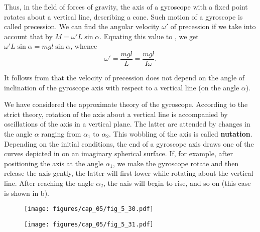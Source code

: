 Thus, in the field of forces of gravity, the axis of a gyroscope with a fixed point rotates about a vertical line, describing a cone. Such motion of a gyroscope is called precession. We can find the angular velocity $\omega'$ of precession if we take into account that by  $M=\omega'L\sin\alpha$. Equating this value to , we get $\omega'L\sin\alpha=mgl\sin\alpha$, whence
\begin{equation}\label{eq:5_72}
	\omega' = \frac{mgl}{L} = \frac{mgl}{I\omega}.
\end{equation}

\noindent
It follows from  that the velocity of precession does not depend on the angle of inclination of the gyroscope axis with respect to a vertical line (on the angle $\alpha$).

We have considered the approximate theory of the gyroscope. According to the strict theory, rotation of the axis about a vertical line is accompanied by oscillations of the axis in a vertical plane. The latter are attended by changes in the angle $\alpha$ ranging from $\alpha_1$ to $\alpha_2$. This wobbling of the axis is called \textbf{nutation}. Depending on the initial conditions, the end of a gyroscope axis draws one of the curves depicted in  on an imaginary spherical surface. If, for example, after positioning the axis at the angle $\alpha_1$, we make the gyroscope rotate and then release the axis gently, the latter will first lower while rotating about the vertical line. After reaching the angle $\alpha_2$, the axis will begin to rise, and so on (this case is shown in b).

\begin{figure}[t]
	\begin{minipage}[t]{0.6\linewidth}
		\begin{center}
			\texttt{[image: figures/cap\_05/fig\_5\_30.pdf]}
			\caption[]{}
			\label{fig:5_30}
		\end{center}
	\end{minipage}
	\hspace{-0.05cm}
	\begin{minipage}[t]{0.36\linewidth}
		\begin{center}
			\texttt{[image: figures/cap\_05/fig\_5\_31.pdf]}
			\caption[]{}
			\label{fig:5_31}
		\end{center}
	\end{minipage}
	\vspace{-0.4cm}
\end{figure}


